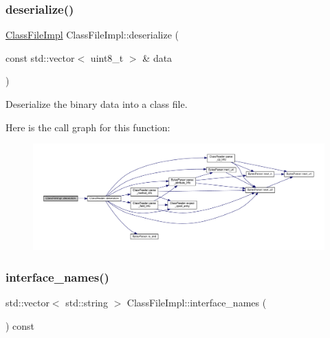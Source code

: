 \subsubsection{\texorpdfstring{deserialize()}{deserialize()}}
{\footnotesize\ttfamily \hyperlink{classClassFileImpl}{Class\+File\+Impl} Class\+File\+Impl\+::deserialize (\begin{DoxyParamCaption}\item[{const std\+::vector$<$ uint8\+\_\+t $>$ \&}]{data }\end{DoxyParamCaption})\hspace{0.3cm}{\ttfamily [static]}}



Deserialize the binary data into a class file. 

Here is the call graph for this function\+:\nopagebreak
\begin{figure}[H]
\begin{center}
\leavevmode
\includegraphics[width=350pt]{classClassFileImpl_abdfa46cef80b0ec30115f1c0c9bb1db6_cgraph}
\end{center}
\end{figure}
\mbox{\label{classClassFileImpl_ad2154cb52119b87cd74b722b69730dee}} 
\subsubsection{\texorpdfstring{interface\+\_\+names()}{interface\_names()}}
{\footnotesize\ttfamily std\+::vector$<$ std\+::string $>$ Class\+File\+Impl\+::interface\+\_\+names (\begin{DoxyParamCaption}{ }\end{DoxyParamCaption}) const}

